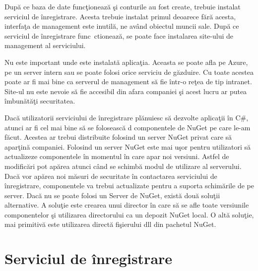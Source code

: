 \documentclass[a4paper,12pt]{report}
\begin{document}
Dup\u a ce baza de date func\c tioneaz\u a \c si conturile au fost create, trebuie instalat serviciul de \^inregistrare.
Acesta trebuie instalat primul deoarece f\u ar\u a acesta, interfa\c ta de management este inutil\u a, ne av\^and obiectul muncii
sale. Dup\u a ce  serviciul de \^inregistrare func\ ctioneaz\u a, se poate face instalarea site-ului de management al 
serviciului.

Nu este important unde este instalat\u a aplica\c tia. Aceasta se poate afla pe Azure, pe un server intern sau se poate
folosi orice serviciu de g\u azduire. Cu toate acestea poate ar fi mai bine ca serverul de management s\u a fie \^intr-o
re\c tea de tip intranet. Site-ul nu este nevoie s\u a fie accesibil din afara companiei \c si acest lucru ar 
putea \^imbun\u at\u a\c ti securitatea.

Dac\u a utilizatorii serviciului de \^inregistrare pl\u anuiesc s\u a dezvolte aplica\c tii \^in C\#,
atunci ar fi cel mai bine s\u a se foloseasc\u a d componentele de NuGet pe care le-am f\u acut.
Acestea ar trebui distribuite folosind un server NuGet privat care s\u a apar\c tin\u a companiei.
Folosind un server NuGet este mai u\c sor pentru utilizatori s\u a actualizeze componentele \^in momentul 
\^in care apar noi versiuni. Astfel de modific\u ari pot ap\u area atunci c\^and se schimb\u a modul de utilizare 
al serverului. Dac\u a vor ap\u area noi m\u asuri de securitate \^in contactarea serviciului de \^inregistrare,
componentele va trebui actualizate pentru a suporta schim\u arile de pe server. Dac\u a nu se poate folosi 
un Server de NuGet, exist\u a dou\u a solu\c tii alternative. A solu\c tie este crearea unui director \^in care s\u a se afle toate versiunile 
componentelor \c si utilizarea directorului ca un depozit NuGet local. O alt\u a solu\c tie, mai primitiv\u a 
este utilizarea direct\u a fi\c sierului dll din pachetul NuGet.

\section{Serviciul de \^inregistrare}
\end{document}
